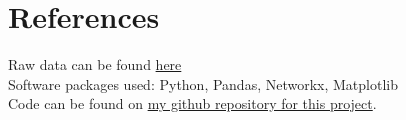 \documentclass{article}
\begin{document}
\section*{References}
Raw data can be found \href{https://data.calgary.ca/Environment/Corporate-Energy-Consumption/crbp-innf/about_data}{here} \\
Software packages used: Python, Pandas, Networkx, Matplotlib \\
Code can be found on \href{https://github.com/shudipto-amin/weighted_bipartite_graph/}{my github repository for this project}.
\end{document}
